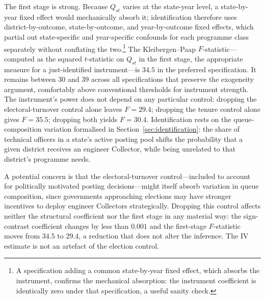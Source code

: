 The first stage is strong. Because $Q_{st}$ varies at the state-year level, a
state-by-year fixed effect would mechanically absorb it; identification therefore
uses district-by-outcome, state-by-outcome, and year-by-outcome fixed effects, which
partial out state-specific and year-specific confounds for each programme class
separately without conflating the two.\footnote{A specification adding a common
state-by-year fixed effect, which absorbs the instrument, confirms the mechanical
absorption: the instrument coefficient is identically zero under that specification,
a useful sanity check.} The Kleibergen--Paap $F$-statistic---computed as the squared
$t$-statistic on $Q_{st}$ in the first stage, the appropriate measure for a
just-identified instrument---is $34.5$ in the preferred specification. It remains
between $30$ and $39$ across all specifications that preserve the exogeneity argument,
comfortably above conventional thresholds for instrument strength. The instrument's
power does not depend on any particular control: dropping the electoral-turnover
control alone leaves $F=29.4$; dropping the tenure control alone gives $F=35.5$;
dropping both yields $F=30.4$. Identification rests on the queue-composition variation
formalised in Section~\ref{sec:identification}: the share of technical officers in a
state's active posting pool shifts the probability that a given district receives an
engineer Collector, while being unrelated to that district's programme needs.

A potential concern is that the electoral-turnover control---included to account for
politically motivated posting decisions---might itself absorb variation in queue
composition, since governments approaching elections may have stronger incentives to
deploy engineer Collectors strategically. Dropping this control affects neither the
structural coefficient nor the first stage in any material way: the sign-contrast
coefficient changes by less than $0.001$ and the first-stage $F$-statistic moves
from $34.5$ to $29.4$, a reduction that does not alter the inference. The IV estimate
is not an artefact of the election control.

